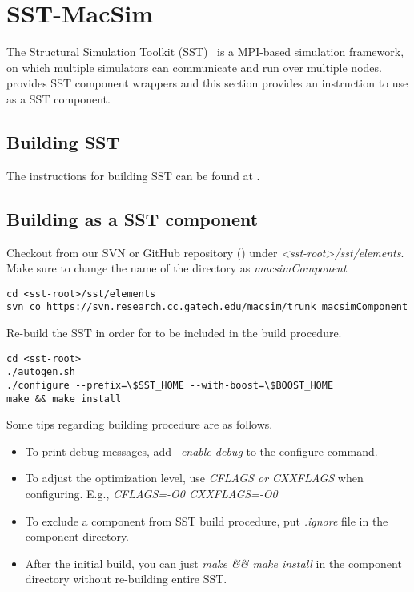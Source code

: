 \section{SST-MacSim}
\label{sec:sst}

The Structural Simulation Toolkit (SST)~\cite{sst} is a MPI-based 
simulation framework, on which multiple simulators can communicate 
and run over multiple nodes. 
\SIM provides SST component wrappers and this section provides 
an instruction to use \SIM as a SST component.


\subsection{Building SST}

The instructions for building SST can be found at 
.


\subsection{Building \SIM as a SST component}

Checkout \SIM from our SVN or GitHub repository () under \textit{<sst-root>/sst/elements}.
Make sure to change the name of the directory as \textit{macsimComponent}.

\begin{Verbatim}
cd <sst-root>/sst/elements
svn co https://svn.research.cc.gatech.edu/macsim/trunk macsimComponent
\end{Verbatim}
Re-build the SST in order for \SIM to be included in the build procedure.

\begin{Verbatim}
cd <sst-root>
./autogen.sh
./configure --prefix=\$SST_HOME --with-boost=\$BOOST_HOME
make && make install
\end{Verbatim}
Some tips regarding building procedure are as follows.
\begin{itemize}
  \item To print debug messages, add \textit{--enable-debug} to the configure command.
  \item To adjust the optimization level, use \textit{CFLAGS or CXXFLAGS} when configuring. E.g., \textit{CFLAGS=-O0 CXXFLAGS=-O0}
  \item To exclude a component from SST build procedure, put \textit{.ignore} file in the component directory.
  \item After the initial build, you can just \textit{make \&\& make install} in the component directory without re-building entire SST.
\end{itemize}




